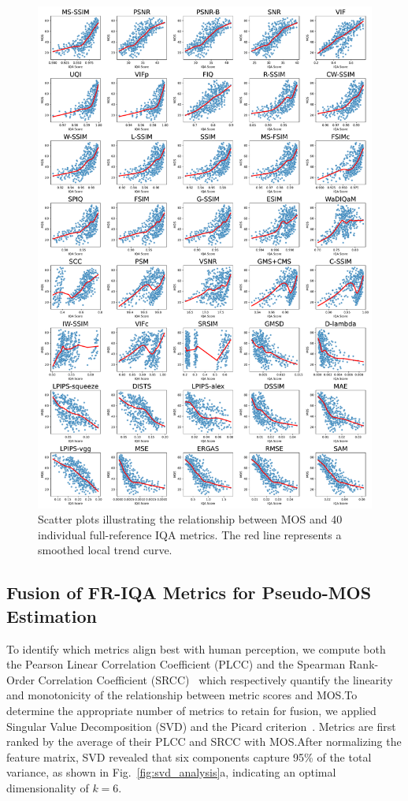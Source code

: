 \begin{figure}
    \centering
    \includegraphics[width=0.98\linewidth]{images/mos_vs_iqa_grid.pdf}
    \caption{Scatter plots illustrating the relationship between MOS and 40 individual full-reference IQA metrics. The red line represents a smoothed local trend curve.}\label{fig:mos_vs_iqa}
\end{figure}

\subsection{Fusion of FR-IQA Metrics for Pseudo-MOS Estimation}

To identify which metrics align best with human perception, we compute both the Pearson Linear Correlation Coefficient (PLCC) and the Spearman Rank-Order Correlation Coefficient (SRCC)~\cite{plcc-srcc} which respectively quantify the linearity and monotonicity of the relationship between metric scores and MOS.\@ To determine the appropriate number of metrics to retain for fusion, we applied Singular Value Decomposition (SVD) and the Picard criterion~\cite{hansen1998picard}. Metrics are first ranked by the average of their PLCC and SRCC with MOS.\@ After normalizing the feature matrix, SVD revealed that six components capture 95\% of the total variance, as shown in Fig.~\ref{fig:svd_analysis}a, indicating an optimal dimensionality of $k=6$.

